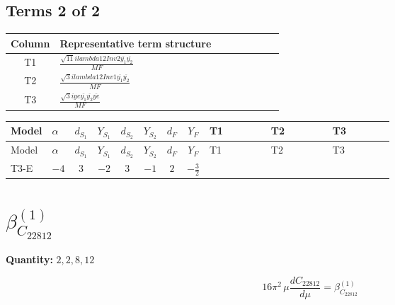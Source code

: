 \documentclass[8pt]{article}
\begin{document}
\begin{landscape}
\subsection*{Terms 2 of 2}
\begin{center}
\begin{tabular}{@{}c >{\raggedright\arraybackslash}p{0.82\linewidth}@{}}
\toprule
Column & Representative term structure \\
\midrule
T1 & \(\displaystyle \frac{\sqrt{11} i lambda12Inv2 \overline{y_{1}} \overline{y_{2}}}{MF}\) \\
\midrule
T2 & \(\displaystyle \frac{\sqrt{3} i lambda12Inv1 \overline{y_{1}} \overline{y_{2}}}{MF}\) \\
\midrule
T3 & \(\displaystyle \frac{\sqrt{3} i ye \overline{y_{1}} \overline{y_{2}} \overline{ye}}{MF}\) \\
\midrule
\bottomrule
\end{tabular}
\end{center}
\smallskip
\tiny
\begin{longtable}{@{}llcccccc >{\raggedright\arraybackslash}p{0.21\linewidth} >{\raggedright\arraybackslash}p{0.21\linewidth} >{\raggedright\arraybackslash}p{0.21\linewidth}@{}}
\toprule
Model & $\alpha$ & $d_{S_1}$ & $Y_{S_1}$ & $d_{S_2}$ & $Y_{S_2}$ & $d_F$ & $Y_F$ & T1 & T2 & T3 \\
\midrule
\endfirsthead
\toprule
Model & $\alpha$ & $d_{S_1}$ & $Y_{S_1}$ & $d_{S_2}$ & $Y_{S_2}$ & $d_F$ & $Y_F$ & T1 & T2 & T3 \\
\midrule
\endhead
T3-E & $-4$ & $3$ & $-2$ & $3$ & $-1$ & $2$ & $-\frac{3}{2}$ & \scriptsize\adjustbox{max width=\linewidth}{$\begin{gathered} - \frac{3 \sqrt{11} i lambda12Inv2 \overline{y_{1}} \overline{y_{2}}}{22 MF}\end{gathered}$} & \scriptsize\adjustbox{max width=\linewidth}{$\begin{gathered} \frac{\sqrt{3} i lambda12Inv1 \overline{y_{1}} \overline{y_{2}}}{6 MF}\end{gathered}$} & \scriptsize\adjustbox{max width=\linewidth}{$\begin{gathered} \frac{\sqrt{3} i ye \overline{y_{1}} \overline{y_{2}} \overline{ye}}{12 MF}\end{gathered}$} \\
\midrule
\bottomrule
\end{longtable}
\clearpage
\section*{$\beta_{C_{22812}}^{(1)}$}
\noindent\textbf{Quantity: }$\mathrm{2,2,8,12}$\par\smallskip
\[16\pi^2\,\mu\frac{d C_{22812}}{d\mu}=\beta_{C_{22812}}^{(1)}\]

\end{landscape}
\end{document}
